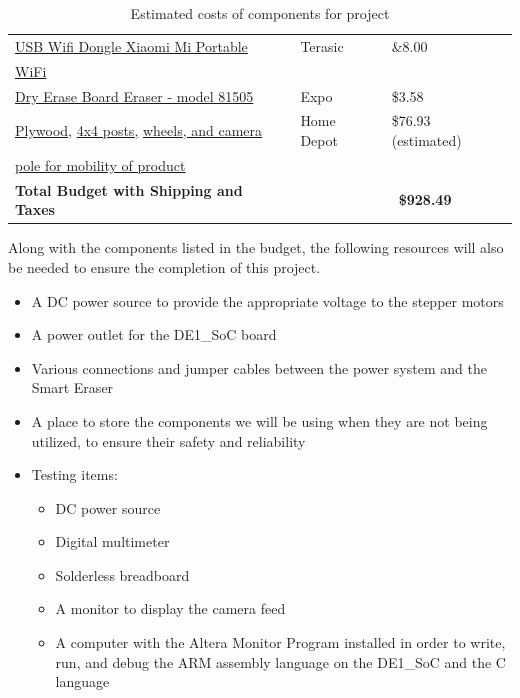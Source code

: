 \begin{table} [H]
\begin{tabular}{|l|l|l|}
		\hline
		\href{https://www.terasic.com.tw/cgi-bin/page/archive.pl?Language=English&CategoryNo=78&No=1027}{USB Wifi Dongle Xiaomi Mi Portable}  & Terasic		& \&8.00 \\
		\href{https://www.terasic.com.tw/cgi-bin/page/archive.pl?Language=English&CategoryNo=78&No=1027}{WiFi}								&				&	\\
		\hline
		\href{https://www.amazon.com/dp/B013FA7VCQ/?coliid=I2RKBBD5A0FCRN&colid=22YAOKWOJAKA9&psc=0&ref_=lv_ov_lig_dp_it}{Dry Erase Board Eraser - model 81505}& Expo			& \$3.58 \\
		\hline
		\href{https://www.homedepot.com/p/Sheathing-Plywood-Common-15-32-in-x-4-ft-x-8-ft-Actual-0-438-in-x-48-in-x-96-in-20159/206827282}{Plywood,}
		\href{https://www.homedepot.com/p/Outdoor-Essentials-4-in-x-4-in-x-6-ft-Pressure-Treated-Cedar-Tone-Moulded-Fence-Post-162525/204126782}{4x4 posts,} 
		\href{https://www.homedepot.com/p/Everbilt-5-in-Swivel-with-Brake-Non-Marking-Rubber-Caster-4031545EB/203672648}{wheels, and camera}	& Home Depot	& \$76.93 (estimated) \\
		\href{https://www.homedepot.com/p/Veranda-Linden-5-in-x-5-in-x-9-ft-White-Vinyl-Routed-Fence-End-Post-73013274/203109195}{ pole for mobility of product}					&				&	\\
		\hline
											\textbf{Total Budget with Shipping and Taxes} & & \ \textbf{\$928.49} \\
		\hline 
	\end{tabular} 
	\caption{Estimated costs of components for project}
	\label{table:1}
\end{table}	

Along with the components listed in the budget, the following resources will also be needed to ensure the completion of this project.

\begin{itemize}
	\item A DC power source to provide the appropriate voltage to the stepper motors
	\item A power outlet for the DE1\_SoC board
	\item Various connections and jumper cables between the power system and the Smart Eraser
	\item A place to store the components we will be using when they are not being utilized, to ensure their safety and reliability
	\item Testing items:
	\begin{itemize}
		\item DC power source
		\item Digital multimeter
		\item Solderless breadboard
		\item A monitor to display the camera feed
		\item A computer with the Altera Monitor Program installed in order to write, run, and debug the ARM assembly language on the DE1\_SoC and the C language
	\end{itemize}
\end{itemize}


